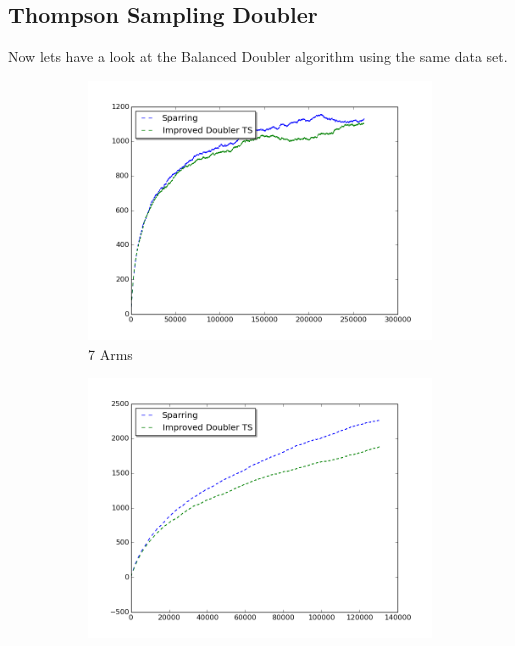 \documentclass{llncs}
\begin{document}
\subsection{Thompson Sampling Doubler}
Now lets have a look at the Balanced Doubler algorithm using the same data set.
\begin{figure}[h!]
\centering
\begin{subfigure}{.5\textwidth}
  \centering
  \includegraphics[scale=0.3, natwidth=410,natheight=442]{figures/improved_doubler_TS_sparring_MQ2007_7arms.png}
  \caption{7 Arms}
  \label{fig:sub1}
\end{subfigure}%
\begin{subfigure}{.5\textwidth}
  \centering
  \includegraphics[scale=0.3, natwidth=410,natheight=442]{figures/improved_doubler_TS_sparring_MQ2007_16arms.png}

\end{subfigure}
\end{figure}
\end{document}
